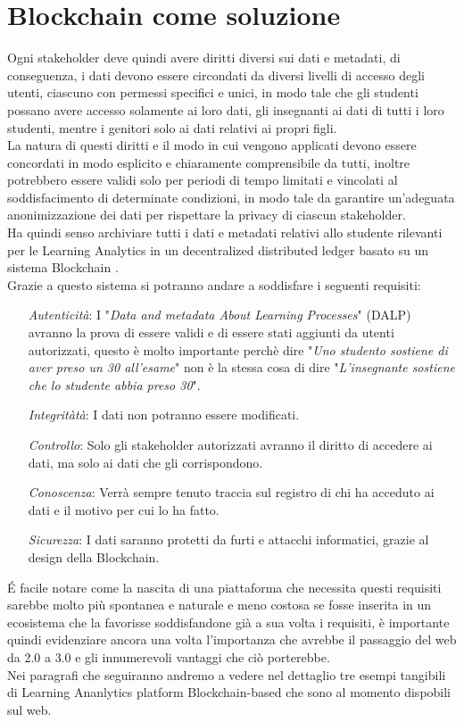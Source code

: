 \section{Blockchain come soluzione}
Ogni stakeholder deve quindi avere diritti diversi sui dati e metadati, 
di conseguenza, i dati devono essere circondati da diversi livelli di accesso degli utenti, ciascuno con permessi specifici e unici,
in modo tale che gli studenti possano avere accesso solamente ai loro dati, gli insegnanti ai dati di tutti i loro studenti, mentre i genitori solo ai dati relativi ai propri figli.
\\La natura di questi diritti e il modo in cui vengono applicati devono essere concordati in modo esplicito e chiaramente comprensibile da tutti, 
inoltre potrebbero essere validi solo per periodi di tempo limitati e vincolati al soddisfacimento di determinate condizioni, in modo tale da garantire un'adeguata anonimizzazione dei dati per rispettare la privacy di ciascun stakeholder.
\\Ha quindi senso archiviare tutti i dati e metadati relativi allo studente rilevanti per le Learning Analytics in un decentralized distributed ledger basato su un sistema Blockchain \cite{Learning_Analytics_Privacy_on_the_Blockchain}.
\\Grazie a questo sistema si potranno andare a soddisfare i seguenti requisiti:
\begin{itemize}
    \item[\textit{Autenticità}:] I "\textit{Data and metadata About Learning Processes}" (DALP) avranno la prova di essere validi e di essere stati aggiunti da utenti autorizzati, questo è molto importante perchè dire "\textit{Uno studento sostiene di aver preso un 30 all'esame}" non è la stessa cosa di dire "\textit{L'insegnante sostiene che lo studente abbia preso 30}".
    \item[\textit{Integritàtà}:] I dati non potranno essere modificati.
    \item[\textit{Controllo}:] Solo gli stakeholder autorizzati avranno il diritto di accedere ai dati, ma solo ai dati che gli corrispondono. 
    \item[\textit{Conoscenza}:] Verrà sempre tenuto traccia sul registro di chi ha acceduto ai dati e il motivo per cui lo ha fatto.
    \item[\textit{Sicurezza}:] I dati saranno protetti da furti e attacchi informatici, grazie al design della Blockchain.
\end{itemize}
\'E facile notare come la nascita di una piattaforma che necessita questi requisiti sarebbe molto più spontanea e naturale e meno costosa se 
fosse inserita in un ecosistema che la favorisse soddisfandone già a sua volta i requisiti, è importante quindi evidenziare ancora una volta
l'importanza che avrebbe il passaggio del web da 2.0 a 3.0 e gli innumerevoli vantaggi che ciò porterebbe.
\\Nei paragrafi che seguiranno andremo a vedere nel dettaglio tre esempi tangibili di Learning Ananlytics platform Blockchain-based che sono al momento dispobili sul web.
\newpage
